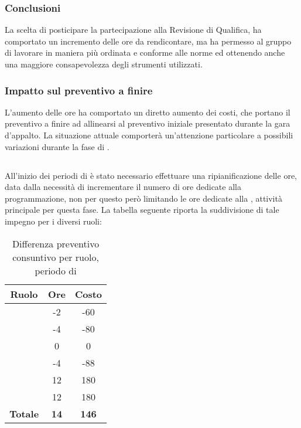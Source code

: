 \subsubsection{Conclusioni}
La scelta di posticipare la partecipazione alla Revisione di Qualifica, ha comportato un incremento delle ore da rendicontare, ma ha permesso al gruppo di lavorare in maniera più ordinata e conforme alle norme ed ottenendo anche una maggiore consapevolezza degli strumenti utilizzati.

\subsubsection{Impatto sul preventivo a finire}
L'aumento delle ore ha comportato un diretto aumento dei costi, che portano il preventivo a finire ad allinearsi al preventivo iniziale presentato durante la gara d'appalto.
La situazione attuale comporterà un'attenzione particolare a possibili variazioni durante la fase di \VV{}.

\subsection{\VV{}}
All'inizio dei periodi di \VV{} è stato necessario effettuare una ripianificazione delle ore, data dalla necessità di incrementare il numero di ore dedicate alla programmazione, non per questo però limitando le ore dedicate alla \VV{}, attività principale per questa fase. La tabella seguente riporta la suddivisione di tale impegno per i diversi ruoli:
\begin{table}[H]
	\centering
	\begin{tabular}{|c|c|c|}
		\hline
		\textbf{Ruolo} &
		\textbf{Ore} &
		\textbf{Costo} \\
		\hline
		\Responsabile & -2 & -60\\
		\hline
		\Amministratore & -4 & -80\\
		\hline
		\Analista & 0 & 0\\
		\hline
		\Progettista & -4 & -88 \\
		\hline
		\Verificatore & 12 & 180 \\
		\hline
		\Programmatore & 12 & 180 \\
		\hline
		\textbf{Totale} & \textbf{14} & \textbf{146} \\
		\hline
	\end{tabular}
	\caption{Differenza preventivo consuntivo per ruolo, periodo di \VV}
\end{table}

